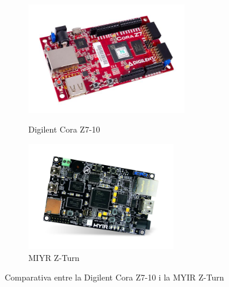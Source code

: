{    \begin{figure}[!htb]
        \centering
        \begin{minipage}[c]{7cm}
            \centering
            \captionsetup{justification=centering}
            \includegraphics[width=7cm]
                { img/4_implementacio/cora-z7.jpg }
            \caption{ Digilent Cora Z7-10 }                
        \end{minipage} \hfil
        \begin{minipage}[c]{7cm}
            \centering
            \captionsetup{justification=centering}
            \includegraphics[width=6.5cm]
                { img/4_implementacio/zturn.png }
            \caption{ MIYR Z-Turn }                
        \end{minipage} \hfil
    \end{figure} 

    \begin{table}[!htb]
        \caption{ Comparativa entre la Digilent Cora Z7-10 i la MYIR Z-Turn }
        \centering
        \tablefirsthead{}
        \tablehead{}
        \tabletail{}
        \tablelasttail{}
        \renewcommand{\arraystretch}{1.3}
    

\end{table}}
